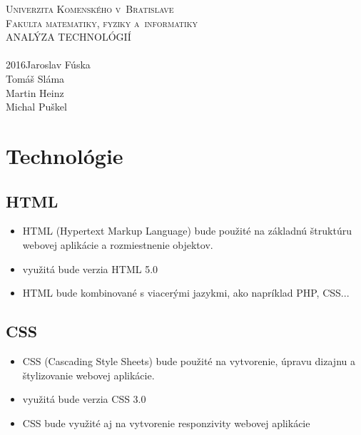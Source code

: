 \documentclass[12pt,a4paper]{report}
\theoremstyle{definition}
\theoremstyle{remark}
\begin{document}
%

\def\nazov{ANALÝZA TECHNOLÓGIÍ}
\def\autorJ{Jaroslav Fúska }
\def\autorT{Tomáš Sláma }
\def\autorH{ Martin Heinz }
\def\autorM{Michal Puškel }
\def\fakulta{Fakulta matematiky, fyziky a~informatiky}
\def\univerzita{Univerzita Komenského v~Bratislave}
\def\mesto{Bratislava}
\def\typprace{Športový klub}
\def\rok{2016}
\thispagestyle{empty}
\begin{center}
\textsc{\LARGE\univerzita}\\
\bigskip\textsc{\LARGE\fakulta}\\
\vfill\textsc{\Huge\nazov}\\
\medskip{\Large\typprace}\\
\vfill{\large\rok\hfill\autorJ\\ \hfill\autorT \\ \hfill \autorH \\ \hfill \autorM}
\end{center}

\tableofcontents

\chapter{Technológie}

\section{HTML}
\begin{itemize}
\item HTML (Hypertext Markup Language) bude použité na základnú štruktúru webovej aplikácie a rozmiestnenie objektov.
\item využitá bude verzia HTML 5.0
\item HTML bude kombinované s viacerými jazykmi, ako napríklad PHP, CSS...
\end{itemize}

\section{CSS}
\begin{itemize}
\item CSS (Cascading Style Sheets) bude použité na vytvorenie, úpravu dizajnu a štylizovanie webovej aplikácie.
\item využitá bude verzia CSS 3.0
\item CSS bude využité aj na vytvorenie responzivity webovej aplikácie
\end{itemize}
\end{document}
